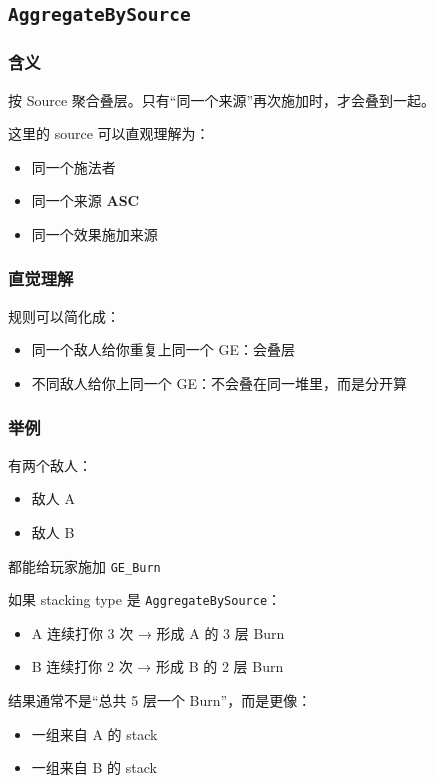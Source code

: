 \subsection{\texttt{AggregateBySource}}

\subsubsection*{含义}
按 Source 聚合叠层。只有“同一个来源”再次施加时，才会叠到一起。

这里的 source 可以直观理解为：

\begin{itemize}
	\item 同一个施法者
	\item 同一个来源 \textbf{ASC}
	\item 同一个效果施加来源
\end{itemize}

\subsubsection*{直觉理解}
规则可以简化成：

\begin{itemize}
	\item 同一个敌人给你重复上同一个 GE：会叠层
	\item 不同敌人给你上同一个 GE：不会叠在同一堆里，而是分开算
\end{itemize}

\subsubsection*{举例}
有两个敌人：

\begin{itemize}
	\item 敌人 A
	\item 敌人 B
\end{itemize}

都能给玩家施加 \texttt{GE\_Burn}

如果 stacking type 是 \texttt{AggregateBySource}：

\begin{itemize}
	\item A 连续打你 3 次 → 形成 A 的 3 层 Burn
	\item B 连续打你 2 次 → 形成 B 的 2 层 Burn
\end{itemize}

结果通常不是“总共 5 层一个 Burn”，而是更像：

\begin{itemize}
	\item 一组来自 A 的 stack
	\item 一组来自 B 的 stack
\end{itemize}

